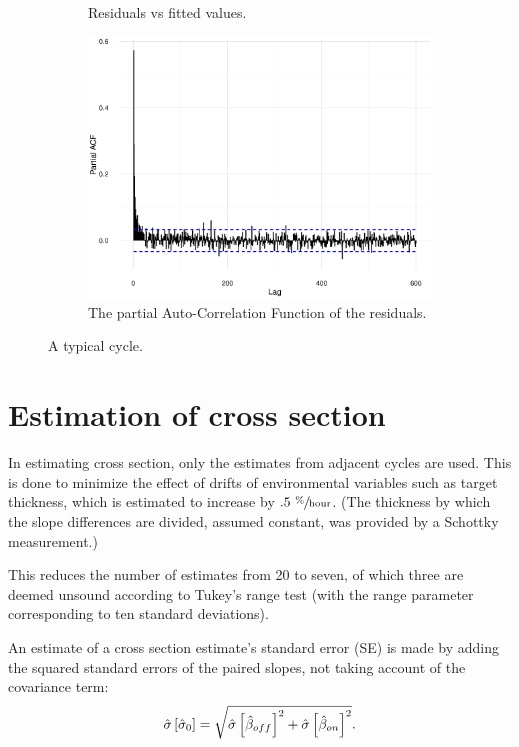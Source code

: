 \documentclass[reprint]{revtex4-1}
\newcommand{\scl}{.4}
\begin{document}
\begin{figure}
\begin{subfigure}{.5\textwidth}
\caption{Residuals vs fitted values.}
\end{subfigure}
\begin{subfigure}{.5\textwidth}
\includegraphics[scale=\scl]{img/Run969_residual_PACF.eps}
\caption{The partial Auto-Correlation Function of the residuals.}
\end{subfigure}
\caption{A typical cycle.\label{fig:Run969}}
\end{figure}

\section{Estimation of cross section}

In estimating cross section, only the estimates from adjacent cycles are used. This is done to minimize the effect of drifts of environmental variables such as target thickness, which is estimated to increase by $.5~ \sfrac{\%}{\mathrm{hour}}$. (The thickness by which the slope differences are divided, assumed constant, was provided by a Schottky measurement.)

This reduces the number of estimates from 20 to seven, of which three are deemed unsound according to Tukey's range test (with the range parameter corresponding to ten standard deviations). 

An estimate of a cross section estimate's standard error (SE) is made by adding the squared standard errors of the paired slopes, not taking account of the covariance term:
\begin{equation}
	\SE*{\CS*[0]} = \sqrt{\SE*{\slp*[off]}^2 + \SE*{\slp*[on]}^2}.
\end{equation}
\end{document}
